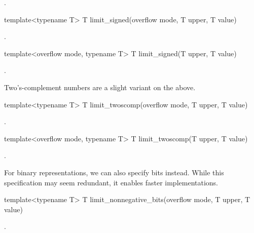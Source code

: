 \begin{addedblock}
\begin{itemdescr}
\returns {}.	
\end{itemdescr}

\begin{itemdecl}
template<typename T> T limit_signed(overflow mode, T upper, T value)		
\end{itemdecl}

\begin{itemdescr}
\returns {}.	
\end{itemdescr}

\begin{itemdecl}
template<overflow mode, typename T> T limit_signed(T upper, T value)		
\end{itemdecl}

\begin{itemdescr}
\returns {}.	
\end{itemdescr}

Two's-complement numbers are a slight variant on the above.

\begin{itemdecl}
template<typename T> T limit_twoscomp(overflow mode, T upper, T value)		
\end{itemdecl}

\begin{itemdescr}
\returns {}.
\end{itemdescr}

\begin{itemdecl}
template<overflow mode, typename T> T limit_twoscomp(T upper, T value)		
\end{itemdecl}

\begin{itemdescr}
\returns {}.	
\end{itemdescr}

For binary representations, we can also specify bits instead. While this specification may seem redundant, it enables faster implementations.

\begin{itemdecl}
template<typename T> T limit_nonnegative_bits(overflow mode, T upper, T value)		
\end{itemdecl}

\begin{itemdescr}
\returns {}.	
\end{itemdescr}


\end{addedblock}
